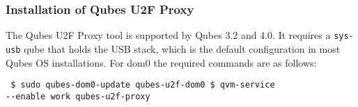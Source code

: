 \documentclass[runningheads,a4paper]{article}
\begin{document}
\subsubsection{Installation of Qubes U2F Proxy} 

The Qubes U2F Proxy
tool is supported by Qubes 3.2 and 4.0. It requires a \texttt{sys-usb}
qube that holds the USB stack, which is the default configuration in
most Qubes OS installations. For dom0 the required commands are as
follows:
\begin{verbatim} $ sudo qubes-dom0-update qubes-u2f-dom0 $ qvm-service
--enable work qubes-u2f-proxy
\end{verbatim}

\nocite{*}





\end{document}
